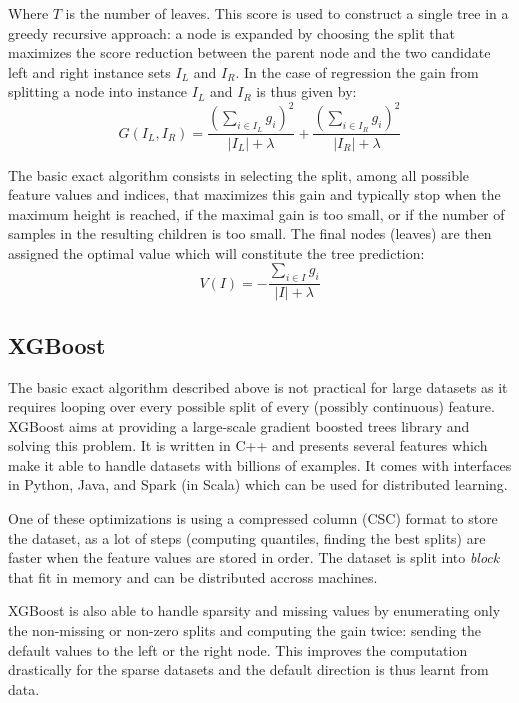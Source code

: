 \documentclass{article}
\theoremstyle{definition}
\begin{document}
Where $T$ is the number of leaves. This score is used to construct a single tree in a greedy recursive approach: a node is expanded by choosing the split that maximizes the score reduction between the parent node and the two candidate left and right instance sets $I_L$ and $I_R$. In the case of regression the gain from splitting a node into instance $I_L$ and $I_R$ is thus given by:
\begin{equation*} 
G(I_L, I_R) = \frac{ \left( \sum_{i \in I_L} g_i \right)^2}{|I_L| + \lambda} + \frac{ \left( \sum_{i \in I_R} g_i \right)^2}{|I_R| + \lambda}
\end{equation*} 

The basic exact algorithm consists in selecting the split, among all possible feature values and indices, that maximizes this gain and typically stop when the maximum height is reached, if the maximal gain is too small, or if the number of samples in the resulting children is too small. The final nodes (leaves) are then assigned the optimal value which will constitute the tree prediction:
\begin{equation}
V(I) = - \frac{\sum_{i \in I} g_i}{\vert I \vert + \lambda}
\label{leafValue}
\end{equation}

\subsection{XGBoost}

The basic exact algorithm described above is not practical for large datasets as it requires looping over every possible split of every (possibly continuous) feature.
XGBoost aims at providing a large-scale gradient boosted trees library and solving this problem. It is written in C++ and presents several features which make
it able to handle datasets with billions of examples. It comes with interfaces in Python, Java, and Spark (in Scala) which can be used for distributed learning.

One of these optimizations is using a compressed column (CSC) format to store the dataset,
as a lot of steps (computing quantiles, finding the best splits) are faster when the feature values are stored in order.
The dataset is split into \textit{block} that fit in memory and can be distributed accross machines. 

XGBoost is also able to handle sparsity and missing values by enumerating only the non-missing or non-zero splits and computing the gain twice:
sending the default values to the left or the right node. This improves the computation drastically for the sparse datasets and the default direction is thus learnt from data.
\end{document}

